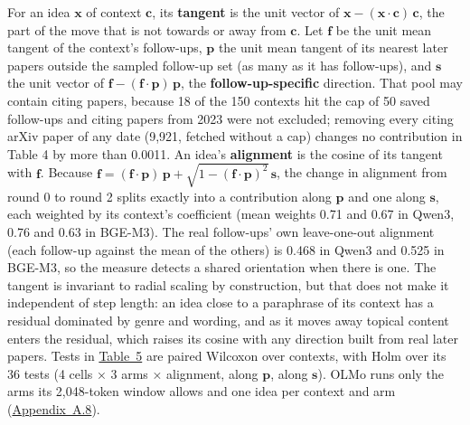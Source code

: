 \documentclass[
  10pt,
]{article}
\begin{document}
For an idea \(\mathbf{x}\) of context
\(\mathbf{c}\), its \textbf{tangent} is
the unit vector of \(\mathbf{x} -
(\mathbf{x}\cdot\mathbf{c})\,\mathbf{c}\),
the part of the move that is not towards
or away from \(\mathbf{c}\). Let
\(\mathbf{f}\) be the unit mean tangent
of the context's follow-ups,
\(\mathbf{p}\) the unit mean tangent of
its nearest later papers outside the
sampled follow-up set (as many as it has
follow-ups), and \(\mathbf{s}\) the unit
vector of
\(\mathbf{f} - (\mathbf{f}\cdot\mathbf{p})\,\mathbf{p}\),
the \textbf{follow-up-specific}
direction. That pool may contain citing
papers, because 18 of the 150 contexts
hit the cap of 50 saved follow-ups and
citing papers from 2023 were not
excluded; removing every citing arXiv
paper of any date (9,921, fetched
without a cap) changes no contribution
in Table 4 by more than 0.0011. An
idea's \textbf{alignment} is the cosine
of its tangent with \(\mathbf{f}\).
Because \(\mathbf{f} =
(\mathbf{f}\cdot\mathbf{p})\,\mathbf{p} + \sqrt{1 - (\mathbf{f}\cdot\mathbf{p})^2}\,\mathbf{s}\),
the change in alignment from round 0 to
round 2 splits exactly into a
contribution along \(\mathbf{p}\) and
one along \(\mathbf{s}\), each weighted
by its context's coefficient (mean
weights 0.71 and 0.67 in Qwen3, 0.76 and
0.63 in BGE-M3). The real follow-ups'
own leave-one-out alignment (each
follow-up against the mean of the
others) is 0.468 in Qwen3 and 0.525 in
BGE-M3, so the measure detects a shared
orientation when there is one. The
tangent is invariant to radial scaling
by construction, but that does not make
it independent of step length: an idea
close to a paraphrase of its context has
a residual dominated by genre and
wording, and as it moves away topical
content enters the residual, which
raises its cosine with any direction
built from real later papers. Tests in
\hyperref[tab:5]{Table~5} are paired
Wilcoxon over contexts, with Holm over
its 36 tests (4 cells × 3 arms ×
alignment, along \(\mathbf{p}\), along
\(\mathbf{s}\)). OLMo runs only the arms
its 2,048-token window allows and one
idea per context and arm
(\hyperref[app:A.8]{Appendix~A.8}).
\end{document}
